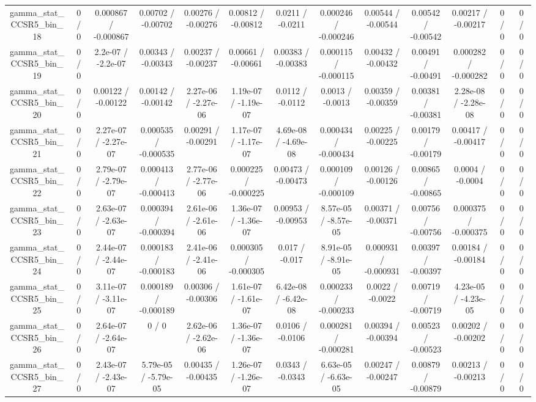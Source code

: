 \documentclass[10pt]{article}
\begin{document}
\begin{table}[htbp]
\begin{center}
\begin{tabular}{|c|c|c|c|c|c|c|c|c|c|c|c|c|}
  gamma_stat_CCSR5_bin_18 & 0 / 0 & 0.000867 / -0.000867 & 0.00702 / -0.00702 & 0.00276 / -0.00276 & 0.00812 / -0.00812 & 0.0211 / -0.0211 & 0.000246 / -0.000246 & 0.00544 / -0.00544 & 0.00542 / -0.00542 & 0.00217 / -0.00217 & 0 / 0 & 0 / 0 \\ 
  gamma_stat_CCSR5_bin_19 & 0 / 0 & 2.2e-07 / -2.2e-07 & 0.00343 / -0.00343 & 0.00237 / -0.00237 & 0.00661 / -0.00661 & 0.00383 / -0.00383 & 0.000115 / -0.000115 & 0.00432 / -0.00432 & 0.00491 / -0.00491 & 0.000282 / -0.000282 & 0 / 0 & 0 / 0 \\ 
  gamma_stat_CCSR5_bin_20 & 0 / 0 & 0.00122 / -0.00122 & 0.00142 / -0.00142 & 2.27e-06 / -2.27e-06 & 1.19e-07 / -1.19e-07 & 0.0112 / -0.0112 & 0.0013 / -0.0013 & 0.00359 / -0.00359 & 0.00381 / -0.00381 & 2.28e-08 / -2.28e-08 & 0 / 0 & 0 / 0 \\ 
  gamma_stat_CCSR5_bin_21 & 0 / 0 & 2.27e-07 / -2.27e-07 & 0.000535 / -0.000535 & 0.00291 / -0.00291 & 1.17e-07 / -1.17e-07 & 4.69e-08 / -4.69e-08 & 0.000434 / -0.000434 & 0.00225 / -0.00225 & 0.00179 / -0.00179 & 0.00417 / -0.00417 & 0 / 0 & 0 / 0 \\ 
  gamma_stat_CCSR5_bin_22 & 0 / 0 & 2.79e-07 / -2.79e-07 & 0.000413 / -0.000413 & 2.77e-06 / -2.77e-06 & 0.000225 / -0.000225 & 0.00473 / -0.00473 & 0.000109 / -0.000109 & 0.00126 / -0.00126 & 0.00865 / -0.00865 & 0.0004 / -0.0004 & 0 / 0 & 0 / 0 \\ 
  gamma_stat_CCSR5_bin_23 & 0 / 0 & 2.63e-07 / -2.63e-07 & 0.000394 / -0.000394 & 2.61e-06 / -2.61e-06 & 1.36e-07 / -1.36e-07 & 0.00953 / -0.00953 & 8.57e-05 / -8.57e-05 & 0.00371 / -0.00371 & 0.00756 / -0.00756 & 0.000375 / -0.000375 & 0 / 0 & 0 / 0 \\ 
  gamma_stat_CCSR5_bin_24 & 0 / 0 & 2.44e-07 / -2.44e-07 & 0.000183 / -0.000183 & 2.41e-06 / -2.41e-06 & 0.000305 / -0.000305 & 0.017 / -0.017 & 8.91e-05 / -8.91e-05 & 0.000931 / -0.000931 & 0.00397 / -0.00397 & 0.00184 / -0.00184 & 0 / 0 & 0 / 0 \\ 
  gamma_stat_CCSR5_bin_25 & 0 / 0 & 3.11e-07 / -3.11e-07 & 0.000189 / -0.000189 & 0.00306 / -0.00306 & 1.61e-07 / -1.61e-07 & 6.42e-08 / -6.42e-08 & 0.000233 / -0.000233 & 0.0022 / -0.0022 & 0.00719 / -0.00719 & 4.23e-05 / -4.23e-05 & 0 / 0 & 0 / 0 \\ 
  gamma_stat_CCSR5_bin_26 & 0 / 0 & 2.64e-07 / -2.64e-07 & 0 / 0 & 2.62e-06 / -2.62e-06 & 1.36e-07 / -1.36e-07 & 0.0106 / -0.0106 & 0.000281 / -0.000281 & 0.00394 / -0.00394 & 0.00523 / -0.00523 & 0.00202 / -0.00202 & 0 / 0 & 0 / 0 \\ 
  gamma_stat_CCSR5_bin_27 & 0 / 0 & 2.43e-07 / -2.43e-07 & 5.79e-05 / -5.79e-05 & 0.00435 / -0.00435 & 1.26e-07 / -1.26e-07 & 0.0343 / -0.0343 & 6.63e-05 / -6.63e-05 & 0.00247 / -0.00247 & 0.00879 / -0.00879 & 0.00213 / -0.00213 & 0 / 0 & 0 / 0 \\ 

\end{tabular}
\end{center}
\end{table}
\end{document}
